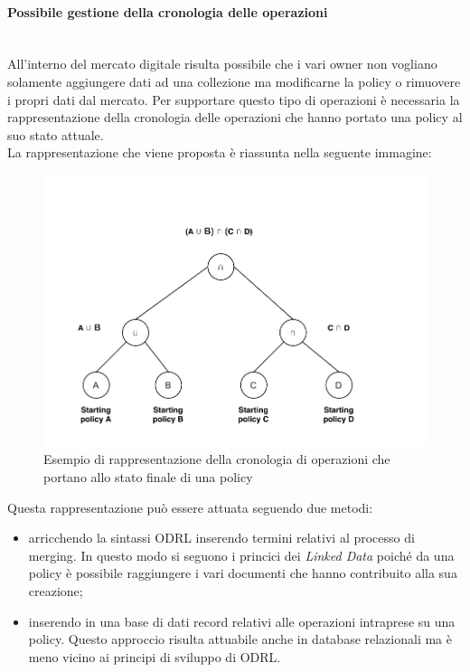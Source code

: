 \documentclass[12pt,a4paper,twoside]{book}
\begin{document}
\paragraph{Possibile gestione della cronologia delle operazioni}\mbox{}\\
All'interno del mercato digitale risulta possibile che i vari owner non vogliano solamente aggiungere dati ad una collezione ma modificarne la policy o rimuovere i propri dati dal mercato. Per supportare questo tipo di operazioni è necessaria la rappresentazione della cronologia delle operazioni che hanno portato una policy al suo stato attuale.\\
La rappresentazione che viene proposta è riassunta nella seguente immagine:
\begin{figure}[H]
\centering
\includegraphics[scale=.50]{../immagini/historyFirst.pdf}
\caption{Esempio di rappresentazione della cronologia di operazioni che portano allo stato finale di una policy}
\label{historyFirst}
\end{figure}
Questa rappresentazione può essere attuata seguendo due metodi:
\begin{itemize}
\item arricchendo la sintassi ODRL inserendo termini relativi al processo di merging. In questo modo si seguono i princici dei \textit{Linked Data} poiché da una policy è possibile raggiungere i vari documenti che hanno contribuito alla sua creazione;
\item inserendo in una base di dati record relativi alle operazioni intraprese su una policy. Questo approccio risulta attuabile anche in database relazionali ma è meno vicino ai principi di sviluppo di ODRL.
\end{itemize}
\end{document}
